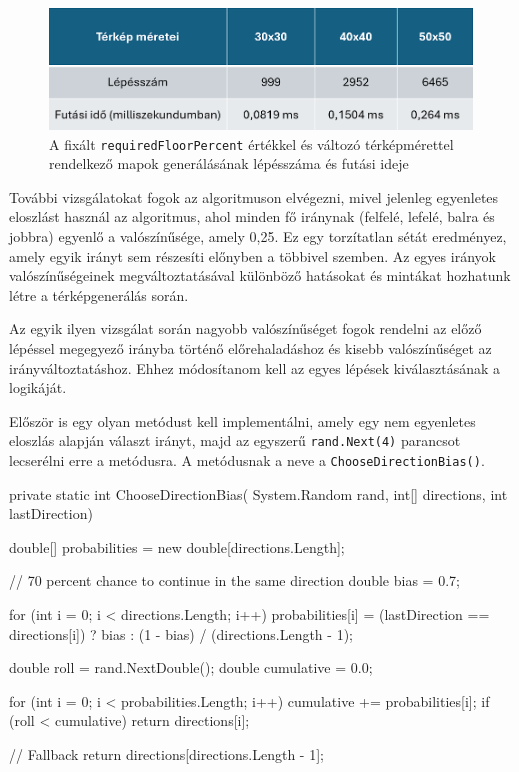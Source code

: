 \begin{figure}[ht]
\centering
\includegraphics[width=\textwidth]{images/runtime4changinmapsizerandomwalk.png}
\caption{A fixált \texttt{requiredFloorPercent} értékkel és változó térképmérettel rendelkező mapok generálásának lépésszáma és futási ideje}
\label{fig:runtimestepcount1}
\end{figure}

\newpage
További vizsgálatokat fogok az algoritmuson elvégezni, mivel jelenleg egyenletes eloszlást használ az algoritmus, ahol minden fő iránynak (felfelé, lefelé, balra és jobbra) egyenlő a valószínűsége, amely 0,25. Ez egy torzítatlan sétát eredményez, amely egyik irányt sem részesíti előnyben a többivel szemben. Az egyes irányok valószínűségeinek megváltoztatásával különböző hatásokat és mintákat hozhatunk létre a térképgenerálás során.

Az egyik ilyen vizsgálat során nagyobb valószínűséget fogok rendelni az előző lépéssel megegyező irányba történő előrehaladáshoz és kisebb valószínűséget az irányváltoztatáshoz. Ehhez módosítanom kell az egyes lépések kiválasztásának a logikáját.

Először is egy olyan metódust kell implementálni, amely egy nem egyenletes eloszlás alapján választ irányt, majd az egyszerű \texttt{rand.Next(4)} parancsot lecserélni erre a metódusra. A metódusnak a neve a \texttt{ChooseDirectionBias()}.

\begin{java}
private static int ChooseDirectionBias(
    System.Random rand, int[] directions, int lastDirection)
{
    double[] probabilities = 
        new double[directions.Length];

    // 70 percent chance to continue in the same direction
    double bias = 0.7; 

    for (int i = 0; i < directions.Length; i++)
    {
        probabilities[i] = 
            (lastDirection == directions[i]) ? 
            bias : (1 - bias) / (directions.Length - 1);
    }

    double roll = rand.NextDouble();
    double cumulative = 0.0;

    for (int i = 0; i < probabilities.Length; i++)
    {
        cumulative += probabilities[i];
        if (roll < cumulative)
        {
            return directions[i];
        }
    }

    // Fallback
    return directions[directions.Length - 1]; 
}
\end{java}

